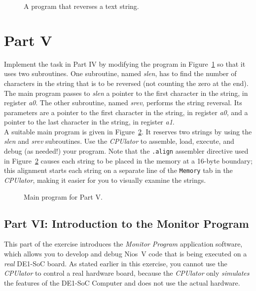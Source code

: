 \documentclass[epsfig,10pt,fullpage]{article}
\begin{document}
\begin{figure}[H]
\begin{center}

\end{center}
\caption{A program that reverses a text string.}
\label{fig:reverse}
\end{figure}

\section*{Part V}

Implement the task in Part IV by modifying the program in Figure~\ref{fig:reverse} so that it
uses two subroutines. One subroutine, named {\it slen}, has to find the number of
characters in the string that is to be reversed (not counting the zero at the
end). The main program passes to {\it slen} a pointer to the first character in the string,
in register {\it a0}.  The other subroutine, named {\it srev}, performs the string reversal. 
Its parameters are a pointer to the first character in the string, in register {\it a0}, and 
a pointer to the last character in the string, in register {\it a1}. 
~\\

\noindent
A suitable main program is given in Figure~\ref{fig:main2}. It reserves two strings by
using the {\it slen} and {\it srev} subroutines. 
Use the {\it CPUlator} to assemble, load, execute, and debug (as needed!) your program. 
Note that the \texttt{.align} assembler directive used in Figure~\ref{fig:main2}
causes each string to be placed in the memory at a 16-byte boundary; this alignment starts
each string on a separate line of the \texttt{Memory} tab in the {\it CPUlator}, making
it easier for you to visually examine the strings.

\begin{figure}[H]
\begin{center}

\end{center}
\caption{Main program for Part V.}
\label{fig:main2}
\end{figure}

\newpage
\subsection*{Part VI: Introduction to the Monitor Program}

\noindent
This part of the exercise introduces the {\it Monitor Program} application software, which 
allows you to develop and debug Nios~V code that is being executed on a
{\it real} DE1-SoC board. As stated earlier in this exercise, you cannot use the 
{\it CPUlator} to control a real hardware board, because the {\it CPUlator} only 
{\it simulates} the features of the DE1-SoC Computer and does not use the actual hardware.
\end{document}
